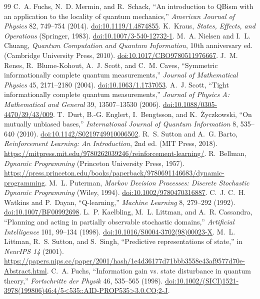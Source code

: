 \documentclass[11pt]{article}
\newcommand{\doi}[1]{\href{https://doi.org/#1}{doi:#1}}
\begin{document}
\begin{thebibliography}{99}
 C.~A. Fuchs, N.~D. Mermin, and R.~Schack,
“An introduction to QBism with an application to the locality of quantum
mechanics,” \emph{American Journal of Physics} 82, 749--754 (2014).
\doi{10.1119/1.4874855}.
 K.~Kraus, \emph{States, Effects, and Operations}
(Springer, 1983). \doi{10.1007/3-540-12732-1}.
 M.~A. Nielsen and I.~L. Chuang,
\emph{Quantum Computation and Quantum Information}, 10th anniversary ed.
(Cambridge University Press, 2010). \doi{10.1017/CBO9780511976667}.
 J.~M. Renes, R.~Blume-Kohout, A.~J. Scott, and C.~M. Caves,
“Symmetric informationally complete quantum measurements,”
\emph{Journal of Mathematical Physics} 45, 2171--2180 (2004).
\doi{10.1063/1.1737053}.
 A.~J. Scott, “Tight informationally complete quantum
measurements,” \emph{Journal of Physics A: Mathematical and General} 39,
13507--13530 (2006). \doi{10.1088/0305-4470/39/43/009}.
 T.~Durt, B.-G. Englert, I.~Bengtsson, and K.~\.{Z}yczkowski,
“On mutually unbiased bases,” \emph{International Journal of Quantum
Information} 8, 535--640 (2010). \doi{10.1142/S0219749910006502}.
 R.~S. Sutton and A.~G. Barto,
\emph{Reinforcement Learning: An Introduction}, 2nd ed. (MIT Press, 2018).
\url{https://mitpress.mit.edu/9780262039246/reinforcement-learning/}.
 R.~Bellman, \emph{Dynamic Programming}
(Princeton University Press, 1957).
\url{https://press.princeton.edu/books/paperback/9780691146683/dynamic-programming}.
 M.~L. Puterman, \emph{Markov Decision Processes:
Discrete Stochastic Dynamic Programming} (Wiley, 1994).
\doi{10.1002/9780470316887}.
 C.~J. C.~H. Watkins and P.~Dayan, “Q-learning,”
\emph{Machine Learning} 8, 279--292 (1992). \doi{10.1007/BF00992698}.
 L.~P. Kaelbling, M.~L. Littman, and A.~R. Cassandra,
“Planning and acting in partially observable stochastic domains,”
\emph{Artificial Intelligence} 101, 99--134 (1998).
\doi{10.1016/S0004-3702(98)00023-X}.
 M.~L. Littman, R.~S. Sutton, and S.~Singh,
“Predictive representations of state,” in \emph{NeurIPS 14} (2001).
\url{https://papers.nips.cc/paper/2001/hash/1e4d36177d71bbb3558e43af9577d70e-Abstract.html}.
 C.~A. Fuchs,
``Information gain vs. state disturbance in quantum theory,''
\emph{Fortschritte der Physik} 46, 535--565 (1998).
\doi{10.1002/(SICI)1521-3978(199806)46:4/5<535::AID-PROP535>3.0.CO;2-J}.

\end{thebibliography}
\end{document}
